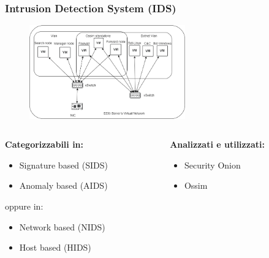 \begin{frame}
    \frametitle{Intrusion Detection System (IDS)}
    \begin{figure}[hbtp]
        \begin{center}
            \includegraphics[width=0.6\textwidth]{res/fig/infrastruttura2.png}
        \end{center}
    \end{figure}
    \begin{columns}[t]
        \begin{column}{0.48\textwidth}
            \textbf{Categorizzabili in:}
            \begin{itemize}
                \item Signature based (SIDS)
                \item Anomaly based (AIDS)
            \end{itemize}
            oppure in:
            \begin{itemize}
                \item Network based (NIDS)
                \item Host based (HIDS)
            \end{itemize}
        \end{column}
        \begin{column}{0.48\textwidth}
            \textbf{Analizzati e utilizzati:}
            \begin{itemize}
                \item Security Onion
                \item Ossim
            \end{itemize}
        \end{column}
    \end{columns}




\end{frame}
